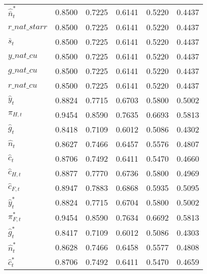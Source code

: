 \begin{center}
\begin{longtable}{lccccc}
${\hat {\bar n}_t^*}      $	 & 	    0.8500	 & 	    0.7225	 & 	    0.6141	 & 	    0.5220	 & 	    0.4437 \\ 
$r\_nat\_starr            $	 & 	    0.8500	 & 	    0.7225	 & 	    0.6141	 & 	    0.5220	 & 	    0.4437 \\ 
${\bar s_t}               $	 & 	    0.8500	 & 	    0.7225	 & 	    0.6141	 & 	    0.5220	 & 	    0.4437 \\ 
$y\_nat\_cu               $	 & 	    0.8500	 & 	    0.7225	 & 	    0.6141	 & 	    0.5220	 & 	    0.4437 \\ 
$g\_nat\_cu               $	 & 	    0.8500	 & 	    0.7225	 & 	    0.6141	 & 	    0.5220	 & 	    0.4437 \\ 
$r\_nat\_cu               $	 & 	    0.8500	 & 	    0.7225	 & 	    0.6141	 & 	    0.5220	 & 	    0.4437 \\ 
${\hat y_t}               $	 & 	    0.8824	 & 	    0.7715	 & 	    0.6703	 & 	    0.5800	 & 	    0.5002 \\ 
${\pi_{H,t}}              $	 & 	    0.9454	 & 	    0.8590	 & 	    0.7635	 & 	    0.6693	 & 	    0.5813 \\ 
${\hat g_t}               $	 & 	    0.8418	 & 	    0.7109	 & 	    0.6012	 & 	    0.5086	 & 	    0.4302 \\ 
${\hat n_t}               $	 & 	    0.8627	 & 	    0.7466	 & 	    0.6457	 & 	    0.5576	 & 	    0.4807 \\ 
${\hat c_t}               $	 & 	    0.8706	 & 	    0.7492	 & 	    0.6411	 & 	    0.5470	 & 	    0.4660 \\ 
${\hat c_{H,t}}           $	 & 	    0.8877	 & 	    0.7770	 & 	    0.6736	 & 	    0.5800	 & 	    0.4969 \\ 
${\hat c_{F,t}}           $	 & 	    0.8947	 & 	    0.7883	 & 	    0.6868	 & 	    0.5935	 & 	    0.5095 \\ 
${\hat y_t^*}             $	 & 	    0.8824	 & 	    0.7715	 & 	    0.6704	 & 	    0.5800	 & 	    0.5002 \\ 
${\pi_{F,t}^*}            $	 & 	    0.9454	 & 	    0.8590	 & 	    0.7634	 & 	    0.6692	 & 	    0.5813 \\ 
${\hat g_t^*}             $	 & 	    0.8417	 & 	    0.7109	 & 	    0.6012	 & 	    0.5086	 & 	    0.4303 \\ 
${\hat n_t^*}             $	 & 	    0.8628	 & 	    0.7466	 & 	    0.6458	 & 	    0.5577	 & 	    0.4808 \\ 
${\hat c_t^*}             $	 & 	    0.8706	 & 	    0.7492	 & 	    0.6411	 & 	    0.5470	 & 	    0.4659 \\ 

\end{longtable}
\end{center}
